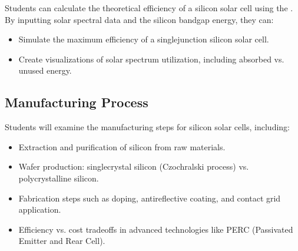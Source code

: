 \documentclass[letterpaper,10pt,english]{jupyterBook}
\begin{document}
\sphinxAtStartPar
{}

\sphinxAtStartPar
Students can calculate the theoretical efficiency of a silicon solar
cell using the . By inputting solar spectral
data and the silicon bandgap energy, they can:
\begin{itemize}
\item {} 
\sphinxAtStartPar
Simulate the maximum efficiency of a single\sphinxhyphen{}junction silicon solar
cell.

\item {} 
\sphinxAtStartPar
Create visualizations of solar spectrum utilization, including
absorbed vs. unused energy.

\end{itemize}


\subsection{Manufacturing Process}
\label{\detokenize{ProjectInstructions:manufacturing-process}}
\sphinxAtStartPar
Students will examine the manufacturing steps for silicon solar cells,
including:
\begin{itemize}
\item {} 
\sphinxAtStartPar
Extraction and purification of silicon from raw materials.

\item {} 
\sphinxAtStartPar
Wafer production: single\sphinxhyphen{}crystal silicon (Czochralski process) vs.
polycrystalline silicon.

\item {} 
\sphinxAtStartPar
Fabrication steps such as doping, anti\sphinxhyphen{}reflective coating, and
contact grid application.

\item {} 
\sphinxAtStartPar
Efficiency vs. cost trade\sphinxhyphen{}offs in advanced technologies like PERC
(Passivated Emitter and Rear Cell).

\end{itemize}
\end{document}
